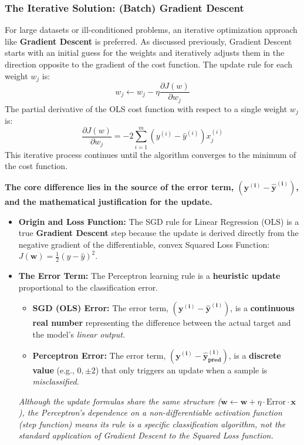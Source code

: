 \subsubsection*{The Iterative Solution: (Batch) Gradient Descent}
For large datasets or ill-conditioned problems, an iterative optimization approach like \textbf{Gradient Descent} is preferred. As discussed previously, Gradient Descent starts with an initial guess for the weights and iteratively adjusts them in the direction opposite to the gradient of the cost function. The update rule for each weight $w_j$ is:
$$ w_j \leftarrow w_j - \eta \frac{\partial J(w)}{\partial w_j} $$
The partial derivative of the OLS cost function with respect to a single weight $w_j$ is:
$$ \frac{\partial J(w)}{\partial w_j} = -2 \sum_{i=1}^{m} (y^{(i)} - \hat{y}^{(i)}) x_j^{(i)} $$
This iterative process continues until the algorithm converges to the minimum of the cost function.

\begin{mdframed}[
    frametitle={Key Distinction: Perceptron Rule vs. Gradient Descent (SGD) on OLS},
    roundcorner=5pt,
    linecolor=blue!50!black,
    frametitlerule=true,
    backgroundcolor=blue!5!white
]
\textbf{The core difference lies in the source of the error term, $\mathbf{(y^{(i)} - \hat{y}^{(i)})}$, and the mathematical justification for the update.}

\vspace{0.5em}

\begin{itemize}
    \item[$\mathbf{1.}$] \textbf{Origin and Loss Function:}
    The SGD rule for Linear Regression (OLS) is a true \textbf{Gradient Descent} step because the update is derived directly from the negative gradient of the differentiable, convex Squared Loss Function: $J(\mathbf{w}) = \frac{1}{2}(y - \hat{y})^2$.

    \item[$\mathbf{2.}$] \textbf{The Error Term:}
    The Perceptron learning rule is a \textbf{heuristic update} proportional to the classification error.
    \begin{itemize}
        \item \textbf{SGD (OLS) Error:} The error term, $\mathbf{(y^{(i)} - \hat{y}^{(i)})}$, is a \textbf{continuous real number} representing the difference between the actual target and the model's \textit{linear output}.
        \item \textbf{Perceptron Error:} The error term, $\mathbf{(y^{(i)} - \hat{y}_{\text{pred}}^{(i)})}$, is a \textbf{discrete value} (e.g., $0, \pm 2$) that only triggers an update when a sample is \textit{misclassified}.
    \end{itemize}

    \textit{Although the update formulas share the same structure ($\mathbf{w} \leftarrow \mathbf{w} + \eta \cdot \text{Error} \cdot \mathbf{x}$), the Perceptron's dependence on a non-differentiable activation function (step function) means its rule is a specific classification algorithm, not the standard application of Gradient Descent to the Squared Loss function.}
\end{itemize}
\end{mdframed}


